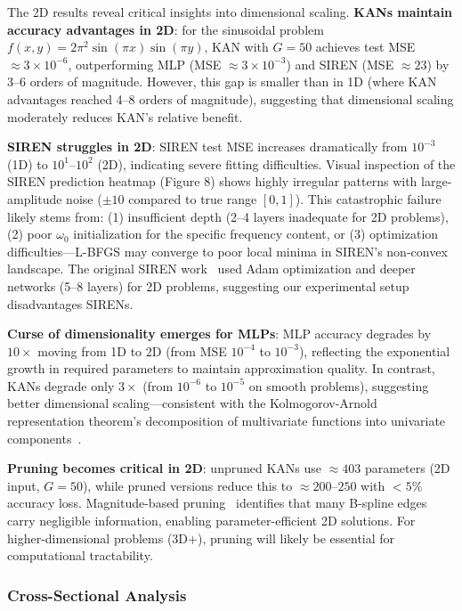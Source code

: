 \documentclass[11pt,a4paper]{article}
\begin{document}
The 2D results reveal critical insights into dimensional scaling. \textbf{KANs maintain accuracy advantages in 2D}: for the sinusoidal problem $f(x,y) = 2\pi^2\sin(\pi x)\sin(\pi y)$, KAN with $G=50$ achieves test MSE $\approx 3 \times 10^{-6}$, outperforming MLP (MSE $\approx 3 \times 10^{-3}$) and SIREN (MSE $\approx 23$) by 3--6 orders of magnitude. However, this gap is smaller than in 1D (where KAN advantages reached 4--8 orders of magnitude), suggesting that dimensional scaling moderately reduces KAN's relative benefit.

\textbf{SIREN struggles in 2D}: SIREN test MSE increases dramatically from $10^{-3}$ (1D) to $10^{1}$--$10^{2}$ (2D), indicating severe fitting difficulties. Visual inspection of the SIREN prediction heatmap (Figure 8) shows highly irregular patterns with large-amplitude noise ($\pm 10$ compared to true range $[0, 1]$). This catastrophic failure likely stems from: (1) insufficient depth (2--4 layers inadequate for 2D problems), (2) poor $\omega_0$ initialization for the specific frequency content, or (3) optimization difficulties—L-BFGS may converge to poor local minima in SIREN's non-convex landscape. The original SIREN work~\citep{sitzmann2020implicit} used Adam optimization and deeper networks (5--8 layers) for 2D problems, suggesting our experimental setup disadvantages SIRENs.

\textbf{Curse of dimensionality emerges for MLPs}: MLP accuracy degrades by $10\times$ moving from 1D to 2D (from MSE $10^{-4}$ to $10^{-3}$), reflecting the exponential growth in required parameters to maintain approximation quality. In contrast, KANs degrade only $3\times$ (from $10^{-6}$ to $10^{-5}$ on smooth problems), suggesting better dimensional scaling—consistent with the Kolmogorov-Arnold representation theorem's decomposition of multivariate functions into univariate components~\citep{liu2024kan}.

\textbf{Pruning becomes critical in 2D}: unpruned KANs use $\approx 403$ parameters (2D input, $G=50$), while pruned versions reduce this to $\approx 200$--$250$ with $<5\%$ accuracy loss. Magnitude-based pruning~\citep{liu2024kan} identifies that many B-spline edges carry negligible information, enabling parameter-efficient 2D solutions. For higher-dimensional problems (3D+), pruning will likely be essential for computational tractability.

\subsubsection{Cross-Sectional Analysis}
\end{document}

